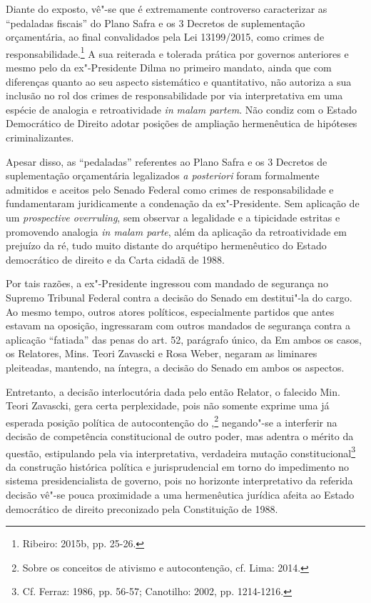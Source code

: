 Diante do exposto, vê"-se que é extremamente controverso caracterizar as
``pedaladas fiscais'' do Plano Safra e os 3 Decretos de suplementação
orçamentária, ao final convalidados pela Lei 13199/2015, como crimes de
responsabilidade.\footnote{Ribeiro: 2015b, pp. 25-26.} A sua reiterada e tolerada
prática por governos anteriores e mesmo pelo da ex"-Presidente Dilma no
primeiro mandato, ainda que com diferenças quanto ao seu aspecto
sistemático e quantitativo, não autoriza a sua inclusão no rol dos
crimes de responsabilidade por via interpretativa em uma espécie de
analogia e retroatividade \emph{in} \emph{malam partem}. Não condiz com
o Estado Democrático de Direito adotar posições de ampliação
hermenêutica de hipóteses criminalizantes.

Apesar disso, as ``pedaladas'' referentes ao Plano Safra e os 3 Decretos
de suplementação orçamentária legalizados \emph{a posteriori} foram
formalmente admitidos e aceitos pelo Senado Federal como crimes de
responsabilidade e fundamentaram juridicamente a condenação da
ex"-Presidente. Sem aplicação de um \emph{prospective overruling}, sem
observar a legalidade e a tipicidade estritas e promovendo analogia
\emph{in malam parte}, além da aplicação da retroatividade em prejuízo
da ré, tudo muito distante do arquétipo hermenêutico do Estado
democrático de direito e da Carta cidadã de 1988.

Por tais razões, a ex"-Presidente ingressou com mandado de segurança no
Supremo Tribunal Federal contra a decisão do Senado em destitui"-la do
cargo. Ao mesmo tempo, outros atores políticos, especialmente partidos
que antes estavam na oposição, ingressaram com outros mandados de
segurança contra a aplicação ``fatiada'' das penas do art. 52, parágrafo
único, da  Em ambos os casos, os Relatores, Mins. Teori Zavascki e
Rosa Weber, negaram as liminares pleiteadas, mantendo, na íntegra, a
decisão do Senado em ambos os aspectos.

Entretanto, a decisão interlocutória dada pelo então Relator, o falecido
Min. Teori Zavascki, gera certa perplexidade, pois não somente exprime
uma já esperada posição política de autocontenção do ,\footnote{Sobre
  os conceitos de ativismo e autocontenção, cf. Lima: 2014.} negando"-se
a interferir na decisão de competência constitucional de outro poder,
mas adentra o mérito da questão, estipulando pela via interpretativa,
verdadeira mutação constitucional\footnote{Cf. Ferraz: 1986, pp. 56-57;
Canotilho: 2002, pp. 1214-1216.} da construção histórica política e
jurisprudencial em torno do impedimento no sistema presidencialista de
governo, pois no horizonte interpretativo da referida decisão vê"-se
pouca proximidade a uma hermenêutica jurídica afeita ao Estado
democrático de direito preconizado pela Constituição de 1988.

